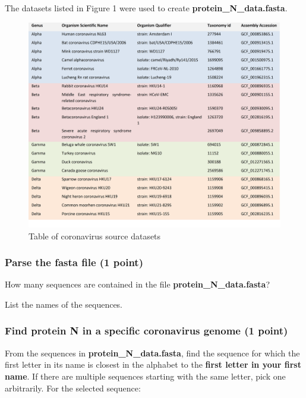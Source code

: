 \documentclass[
  a4paper,
  DIV=11,
  numbers=noendperiod]{scrartcl}
\begin{document}
The datasets listed in Figure 1 were used to create
\textbf{protein\_N\_data.fasta}.

\begin{figure}

{\centering \includegraphics{assgn2_coronavirus_table.png}

}

\caption{Table of coronavirus source datasets}

\end{figure}

\hypertarget{parse-the-fasta-file-1-point}{%
\subsubsection{Parse the fasta file (1
point)}\label{parse-the-fasta-file-1-point}}

How many sequences are contained in the file
\textbf{protein\_N\_data.fasta}?

List the names of the sequences.

\hypertarget{find-protein-n-in-a-specific-coronavirus-genome-1-point}{%
\subsubsection{Find protein N in a specific coronavirus genome (1
point)}\label{find-protein-n-in-a-specific-coronavirus-genome-1-point}}

From the sequences in \textbf{protein\_N\_data.fasta}, find the sequence
for which the first letter in its name is closest in the alphabet to the
\textbf{first letter in your first name}. If there are multiple
sequences starting with the same letter, pick one arbitrarily. For the
selected sequence:
\end{document}
